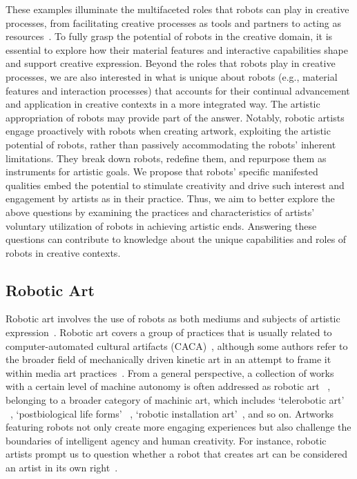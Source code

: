 These examples illuminate the multifaceted roles that robots can play in creative processes, from facilitating creative processes as tools and partners to acting as resources~\cite{chung2021intersection}. To fully grasp the potential of robots in the creative domain, it is essential to explore how their material features and interactive capabilities shape and support creative expression. Beyond the roles that robots play in creative processes, we are also interested in what is unique about robots (e.g., material features and interaction processes) that accounts for their continual advancement and application in creative contexts in a more integrated way. The artistic appropriation of robots may provide part of the answer. Notably, robotic artists engage proactively with robots when creating artwork, exploiting the artistic potential of robots, rather than passively accommodating the robots' inherent limitations. They break down robots, redefine them, and repurpose them as instruments for artistic goals. We propose that robots' specific manifested qualities embed the potential to stimulate creativity and drive such interest and engagement by artists as in their practice. Thus, we aim to better explore the above questions by examining the practices and characteristics of artists' voluntary utilization of robots in achieving artistic ends. Answering these questions can contribute to knowledge about the unique capabilities and roles of robots in creative contexts.

\subsection{Robotic Art}

Robotic art involves the use of robots as both mediums and subjects of artistic expression~\cite{penny2016robotics, kac1997foundation}. Robotic art covers a group of practices that is usually related to computer-automated cultural artifacts (CACA)~\cite{penny2013art}, although some authors refer to the broader field of mechanically driven kinetic art in an attempt to frame it within media art practices~\cite{hoetzlein2009new}. From a general perspective, a collection of works with a certain level of machine autonomy is often addressed as robotic art ~\cite{kac2001origin}, belonging to a broader category of machinic art, which includes `telerobotic art' ~\cite{reichle2009art}, `postbiological life forms' ~\cite{reichle2009art}, `robotic installation art'~\cite{shi2023what}, and so on. Artworks featuring robots not only create more engaging experiences but also challenge the boundaries of intelligent agency and human creativity. For instance, robotic artists prompt us to question whether a robot that creates art can be considered an artist in its own right~\cite{shi2023what, mika2022can}.

